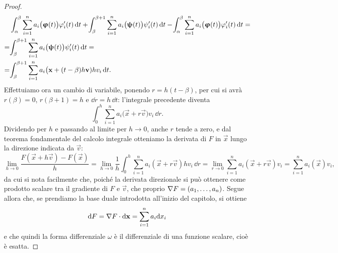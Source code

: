 \begin{proof}
\begin{equation}
\begin{aligned}
			&\int_\alpha^\beta\sum_{i=1}^na_i\big(\bm{\upvarphi}(t)\big)\varphi_i'(t)\,\textup{d} t+\!\int_\beta^{\beta+1}\sum_{i=1}^na_i\big(\bm{\uppsi}(t)\big)\psi_i'(t)\,\textup{d} t-\!\int_\alpha^\beta\sum_{i=1}^na_i\big(\bm{\upvarphi}(t)\big)\varphi_i'(t)\,\textup{d} t=\\
			=&\!\int_\beta^{\beta+1}\sum_{i=1}^na_i\big(\bm{\uppsi}(t)\big)\psi_i'(t)\,\textup{d} t=\\
			=&\!\int_\beta^{\beta+1}\sum_{i=1}^na_i\big(\mathbf{x}+(t-\beta)h\mathbf{v})hv_i\,\textup{d} t.
		\end{aligned}
	\end{equation}
	Effettuiamo ora un cambio di variabile, ponendo $r=h(t-\beta)$, per cui si avrà $r(\beta)=0$, $r(\beta+1)=h$ e $\dd r=h\,\dd t$: l'integrale precedente diventa
	\begin{equation}
		\int_0^h\sum_{i=1}^na_i\big(\vec x+r\vec v)v_i\,\dd r.
	\end{equation}
	Dividendo per $h$ e passando al limite per $h\to0$, anche $r$ tende a zero, e dal teorema fondamentale del calcolo integrale otteniamo la derivata di $F$ in $\vec x$ lungo la direzione indicata da $\vec v$:
	\begin{equation}
		\lim_{h\to0}\frac{F(\vec x+h\vec v)-F(\vec x)}{h}=\lim_{h\to0}\frac1{h}\int_0^h\sum_{i=1}^na_i(\vec x+r\vec v)hv_i\,\dd r=\lim_{r\to 0}\sum_{i=1}^na_i(\vec x+r\vec v)v_i=\sum_{i=1}^na_i(\vec x)v_i,
	\end{equation}
	da cui si nota facilmente che, poiché la derivata direzionale si può ottenere come prodotto scalare tra il gradiente di $F$ e $\vec v$, che proprio $\nabla F=(a_1,\dots,a_n)$. Segue allora che, se prendiamo la base duale introdotta all'inizio del capitolo, si ottiene
	\begin{equation}
		\textup{d} F={\nabla F}\cdot{\textup{d}\mathbf{x}}=\sum_{i=1}^na_i\textup{d} x_i
	\end{equation}
	e che quindi la forma differenziale $\omega$ è il differenziale di una funzione scalare, cioè è esatta.
\end{proof}

